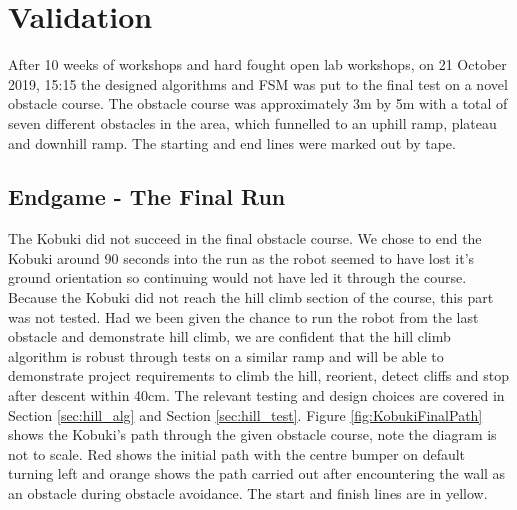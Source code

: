 \clearpage
\section{Validation}\label{sec:validation}
\vspace{-0.2cm} After 10 weeks of workshops and hard fought open lab workshops, on 21 October 2019, 15:15 the designed algorithms and FSM was put to the final test on a novel obstacle course. The obstacle course was approximately 3m by 5m with a total of seven different obstacles in the area, which funnelled to an uphill ramp, plateau and downhill ramp. The starting and end lines were marked out by tape.

\subsection{Endgame - The Final Run}\label{sec:finalrun}
\vspace{-0.2cm} The Kobuki did not succeed in the final obstacle course. We chose to end the Kobuki around 90 seconds into the run as the robot seemed to have lost it's ground orientation so continuing would not have led it through the course. Because the Kobuki did not reach the hill climb section of the course, this part was not tested. Had we been given the chance to run the robot from the last obstacle and demonstrate hill climb, we are confident that the hill climb algorithm is robust through tests on a similar ramp and will be able to demonstrate project requirements to climb the hill, reorient, detect cliffs and stop after descent within 40cm. The relevant testing and design choices are covered in Section \ref{sec:hill_alg} and Section \ref{sec:hill_test}. Figure \ref{fig:KobukiFinalPath} shows the Kobuki's path through the given obstacle course, note the diagram is not to scale. Red shows the initial path with the centre bumper on default turning left and orange shows the path carried out after encountering the wall as an obstacle during obstacle avoidance. The start and finish lines are in yellow.
